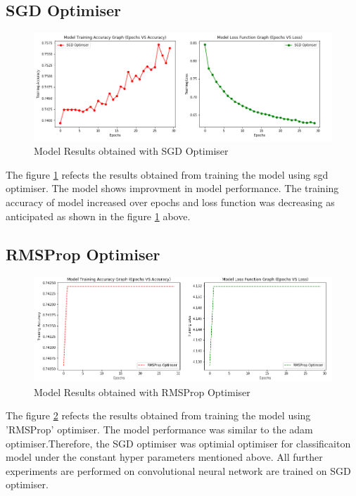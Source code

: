 \subsection{SGD Optimiser}
\begin{figure}[!htp]
    \centering
    \includegraphics[width=15cm]{Images/SGD.png}
    \caption{Model Results obtained with SGD Optimiser}
    \label{fig:sgd}
\end{figure}


The figure \ref{fig:sgd} refects the results obtained from training the model using sgd optimiser. The model shows improvment in model 
performance. The training accuracy of model increased over epochs and loss function was decreasing as anticipated as shown in the figure 
\ref{fig:sgd} above.


\subsection{RMSProp Optimiser}
\begin{figure}[!htp]
    \centering
    \includegraphics[width=15cm]{Images/rmsprop.png}
    \caption{Model Results obtained with RMSProp Optimiser}
    \label{fig:rms}
\end{figure}


The figure \ref{fig:rms} refects the results obtained from training the model using 'RMSProp' optimiser. The model performance was similar to 
the adam optimiser.Therefore, the SGD optimiser was optimial optimiser for classificaiton model under the constant hyper parameters mentioned above.
All further experiments are performed on convolutional neural network are trained on SGD optimiser.

